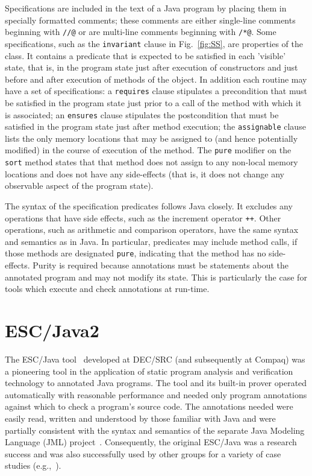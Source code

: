 \documentclass{sig-alternate}
\begin{document}
Specifications are included in the text of a Java program by placing them in 
specially formatted comments; these comments are either single-line comments
beginning with  \texttt{//@} or are multi-line comments beginning with  \texttt{/*@}.
Some specifications, such as the \texttt{invariant} clause
in Fig.~\ref{fig:SS},  are properties of the class.
It contains a predicate that is expected to be satisfied in 
each 'visible' state, that is, in the program state just after execution of constructors and
just before and after execution of methods of the object.  In addition each routine may
have a set of specifications: a \texttt{requires} clause 
stipulates a precondition that must be satisfied in the program state just prior to a call
of the method with which it is associated; an \texttt{ensures} clause stipulates the 
postcondition that must be satisfied in the program state just after method execution;
the \texttt{assignable} clause lists the only memory locations that may be assigned to (and hence 
potentially modified) in the course of execution of the method.  The \texttt{pure} modifier on the \texttt{sort} method states that that method does not assign to any non-local memory locations
and does not have any side-effects (that is, it does not change any observable aspect of 
the program state).

The syntax of the specification predicates follows Java closely.  It excludes any operations 
that have side effects, such as the increment operator
 \texttt{++}.  Other operations, such as arithmetic and 
comparison operators, have the same syntax and semantics as in Java.  In particular, 
predicates may include method calls, if those methods are designated \texttt{pure},
indicating that the method has no side-effects.  Purity is
required because annotations must be statements
about the annotated program and may not modify its state.  This is particularly the case for
tools which execute and check annotations at run-time.

\section{ESC/Java2}

The ESC/Java tool~\cite{Flanagan-etal02} developed at DEC/SRC 
(and subsequently at Compaq) was a pioneering tool in the
application of static program analysis and verification technology to
annotated Java programs.  The tool and its built-in
prover operated automatically with reasonable performance and needed
only program annotations against which to check a program's source
code.  The annotations needed were easily read, written and understood
by those familiar with Java and were partially consistent with the syntax
and semantics of the separate Java Modeling Language (JML)
project~\cite{jmlpapers,Leavens-etal00}.  Consequently, the original
ESC/Java was a research success
and was also successfully used by other groups for a variety of case
studies (e.g.,~\cite{Hub03,HOP04}).
\end{document}
